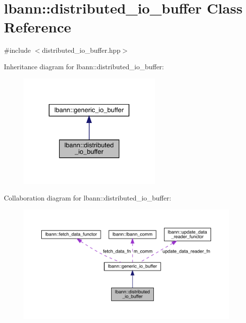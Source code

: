 \hypertarget{classlbann_1_1distributed__io__buffer}{}\section{lbann\+:\+:distributed\+\_\+io\+\_\+buffer Class Reference}
\label{classlbann_1_1distributed__io__buffer}


{\ttfamily \#include $<$distributed\+\_\+io\+\_\+buffer.\+hpp$>$}



Inheritance diagram for lbann\+:\+:distributed\+\_\+io\+\_\+buffer\+:\nopagebreak
\begin{figure}[H]
\begin{center}
\leavevmode
\includegraphics[width=203pt]{classlbann_1_1distributed__io__buffer__inherit__graph}
\end{center}
\end{figure}


Collaboration diagram for lbann\+:\+:distributed\+\_\+io\+\_\+buffer\+:\nopagebreak
\begin{figure}[H]
\begin{center}
\leavevmode
\includegraphics[width=350pt]{classlbann_1_1distributed__io__buffer__coll__graph}
\end{center}
\end{figure}
